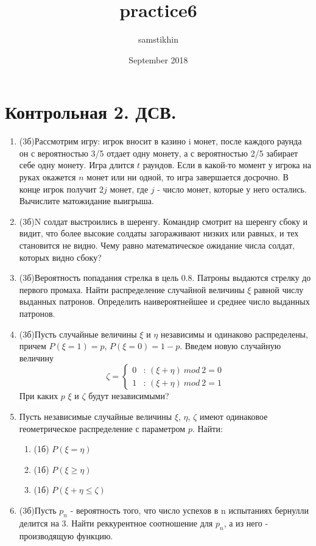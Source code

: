 \documentclass[a4paper, 14pt]{extarticle}
\title{practice6}
\author{samstikhin}
\date{September 2018}
\begin{document}
\section*{Контрольная 2. ДСВ.}
\begin{enumerate}
\item (3б)Рассмотрим игру: игрок вносит в казино i монет, после каждого раунда он с вероятностью 3/5 отдает одну монету, а с вероятностью 2/5 забирает себе одну монету. Игра длится $t$ раундов. Если в какой-то момент у игрока на руках окажется $n$ монет или ни одной, то игра завершается досрочно. В конце игрок получит $2j$ монет, где $j$ - число монет, которые у него остались. Вычислите матожидание выигрыша.
\item (3б)N солдат выстроились в шеренгу. Командир смотрит на шеренгу сбоку и видит, что более высокие солдаты загораживают низких или равных, и тех становится не видно. Чему равно математическое ожидание числа солдат, которых видно сбоку?

	\item (3б)Вероятность попадания стрелка в цель 0.8. Патроны выдаются стрелку до первого промаха. Найти распределение случайной величины $\xi$ равной числу выданных патронов. Определить наивероятнейшее и среднее число выданных патронов.
	\item (3б)Пусть случайные величины $\xi$ и $\eta$ независимы и одинаково распределены, причем $P(\xi = 1) = p$, $P(\xi = 0) = 1-p$. Введем новую случайную величину $$\zeta = \begin{cases} 0& \text{: $(\xi + \eta) ~mod ~2 = 0$} \\ 1& \text{: $(\xi+\eta) ~mod ~2 = 1$} \end{cases}$$
	При каких $p$ $\xi$ и $\zeta$ будут независимыми?
	\item Пусть независимые случайные величины $\xi$, $\eta$, $\zeta$ имеют одинаковое геометрическое распределение с параметром $p$. Найти:
	\begin{enumerate}
	    \item (1б) $P(\xi=\eta)$
	    \item (1б) $P(\xi\geq\eta)$
	    \item (1б) $P(\xi+\eta\leq\zeta)$
	\end{enumerate}
	\item (3б)Пусть $p_n$ - вероятность того, что число успехов в n испытаниях бернулли делится на 3. Найти реккурентное соотношение для $p_n$, а из него - производящую функцию.




\end{enumerate}
\end{document}
